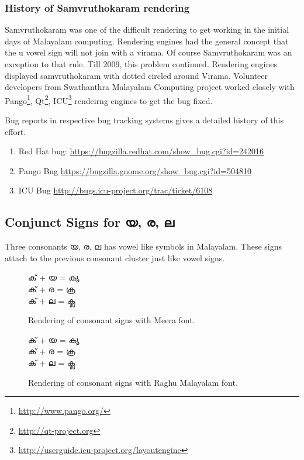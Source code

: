 \subsubsection{History of Samvruthokaram rendering}

Samvruthokaram was one of the difficult rendering to get working in the initial 
days of Malayalam computing.
Rendering engines had the general concept that the u vowel sign will not join 
with a virama. Of course Samvruthokaram was an exception to that rule.
Till 2009, this problem continued. Rendering engines displayed samvruthokaram 
with dotted circled around Virama. 
Volunteer developers from Swathanthra Malayalam Computing project worked 
closely with Pango\footnote{\url{http://www.pango.org/}}, 
Qt\footnote{\url{http://qt-project.org}}, 
ICU\footnote{\url{http://userguide.icu-project.org/layoutengine}} rendeirng 
engines to get the bug fixed.

Bug reports in respective bug tracking systems gives a detailed history of this 
effort.

\begin{enumerate}
  \item Red Hat bug: \url{https://bugzilla.redhat.com/show_bug.cgi?id=242016}
  \item Pango Bug \url{https://bugzilla.gnome.org/show_bug.cgi?id=504810}
  \item ICU Bug \url{http://bugs.icu-project.org/trac/ticket/6108}
\end{enumerate}

\subsection {Conjunct Signs for യ, ര, ല}

Three consonants {\malayalam യ, ര, ല} has vowel like symbols in Malayalam.
These signs attach to the previous consonant cluster just like vowel signs.

\begin{figure}[h!]
  \centering
  {\meera\textexample ക് + യ = ക്യ \\ ക് + ര = ക്ര \\ ക് + ല = ക്ല }\\
  \caption{Rendering of consonant signs with Meera font.}
\end{figure}

\begin{figure}[h!]
  \centering
  {\raghumalayalam\textexample ക് + യ = ക്യ \\ ക് + ര = ക്ര \\ ക് + ല = ക്ല }\\
  \caption{Rendering of consonant signs with Raghu Malayalam font.}
\end{figure}

